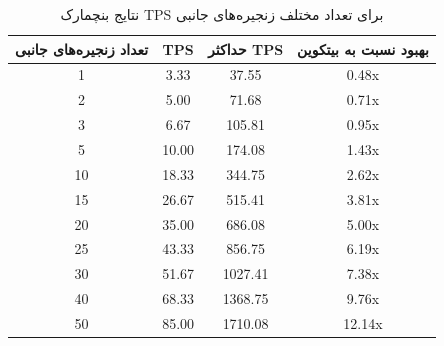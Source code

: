 \begin{table}[h]
\centering
\caption{نتایج بنچمارک TPS برای تعداد مختلف زنجیره‌های جانبی}
\label{tab:tps-benchmark}
\begin{tabular}{|c|c|c|c|}
\hline
\textbf{تعداد زنجیره‌های جانبی} & \textbf{TPS} & \textbf{حداکثر TPS} & \textbf{بهبود نسبت به بیتکوین} \\ \hline
1 & 3.33 & 37.55 & 0.48x \\ \hline
2 & 5.00 & 71.68 & 0.71x \\ \hline
3 & 6.67 & 105.81 & 0.95x \\ \hline
5 & 10.00 & 174.08 & 1.43x \\ \hline
10 & 18.33 & 344.75 & 2.62x \\ \hline
15 & 26.67 & 515.41 & 3.81x \\ \hline
20 & 35.00 & 686.08 & 5.00x \\ \hline
25 & 43.33 & 856.75 & 6.19x \\ \hline
30 & 51.67 & 1027.41 & 7.38x \\ \hline
40 & 68.33 & 1368.75 & 9.76x \\ \hline
50 & 85.00 & 1710.08 & 12.14x \\ \hline
\end{tabular}
\end{table}
